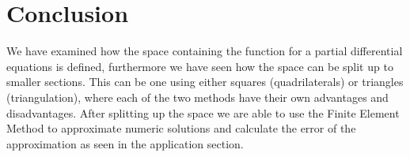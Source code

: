 \section{Conclusion}
We have examined how the space containing the function for a partial differential equations is defined, furthermore we have seen how the space can be split up to smaller sections.
This can be one using either squares (quadrilaterals) or triangles (triangulation), where each of the two methods have their own advantages and disadvantages.
After splitting up the space we are able to use the Finite Element Method to approximate numeric solutions and calculate the error of the approximation as seen in the application section.